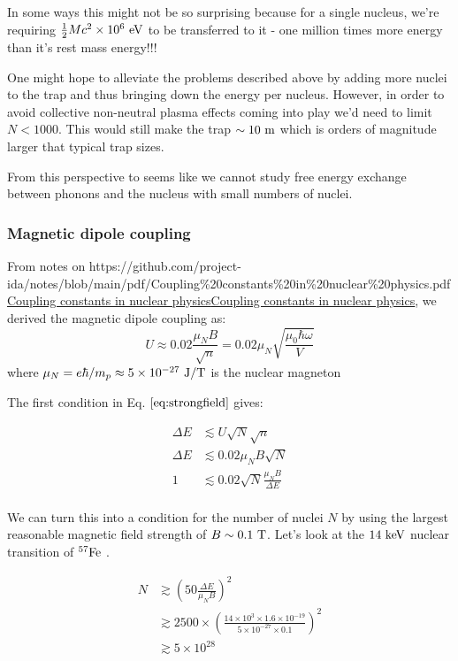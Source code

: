 \documentclass[
]{article}
\let\oldhref\href
\renewcommand{\href}[2]{\ifx#1\urlprefix\oldhref{#1}{#2}\else\uline{\oldhref{#1}{#2}}\fi}
\renewcommand{\[}{\begin{equation}}
\renewcommand{\]}{\end{equation}}
\begin{document}
In some ways this might not be so surprising because for a single
nucleus, we're requiring \(\frac{1}{2}Mc^2\times 10^6 \ \rm eV\) to be
transferred to it - one million times more energy than it's rest mass
energy!!!

One might hope to alleviate the problems described above by adding more
nuclei to the trap and thus bringing down the energy per nucleus.
However, in order to avoid collective non-neutral plasma effects coming
into play we'd need to limit \(N < 1000\). This would still make the
trap \(\sim 10 \ \rm m\) which is orders of magnitude larger that
typical trap sizes.

From this perspective to seems like we cannot study free energy exchange
between phonons and the nucleus with small numbers of nuclei.

\subsubsection{Magnetic dipole coupling}\label{magnetic-dipole-coupling}

From notes on
\href{https://github.com/project-ida/notes/blob/main/pdf/Coupling\%20constants\%20in\%20nuclear\%20physics.pdf}{Coupling
constants in nuclear physics}, we derived the magnetic dipole coupling
as: \[
U \approx 0.02 \frac{{\mu_N}B}{\sqrt{n}} = 0.02 {\mu_N}\sqrt{\frac{\mu_0\hbar\omega}{V}}
\] where \(\mu_N = e\hbar/m_p \approx 5\times 10^{-27} \ \rm J/T\) is
the nuclear magneton

The first condition in Eq. \(\ref{eq:strongfield}\) gives:

\[
\begin{aligned}
\Delta E &\lesssim U\sqrt{N}\sqrt{n} \\
{\Delta E} &\lesssim  0.02 \mu_N B \sqrt{N} \\
1 &\lesssim 0.02\sqrt{N}\frac{\mu_N B}{\Delta E} \\
\end{aligned}
\]

We can turn this into a condition for the number of nuclei \(N\) by
using the largest reasonable magnetic field strength of
\(B\sim 0.1 \ \rm T\). Let's look at the \(\rm 14 \ keV\) nuclear
transition of \(\rm ^{57}Fe\) .

\[
\begin{aligned}
N &\gtrsim \left(50\frac{\Delta E}{\mu_N B}\right)^2 \\
&\gtrsim 2500 \times \left(\frac{14 \times 10^3 \times 1.6\times 10^{-19}}{5\times 10^{-27}\times 0.1}\right)^2 \\
&\gtrsim 5 \times 10^{28}
\end{aligned}
\]
\end{document}
